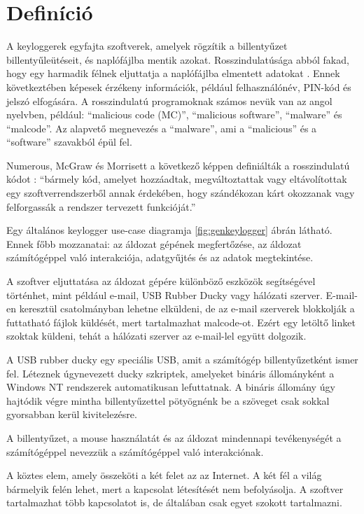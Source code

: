 \documentclass[12pt,a4paper,oneside]{report}
\begin{document}
\section{Definíció}
A keyloggerek egyfajta szoftverek, amelyek rögzítik a billentyűzet billentyűleütéseit, és naplófájlba mentik azokat. Rosszindulatúsága abból fakad, hogy egy harmadik félnek eljuttatja a naplófájlba elmentett adatokat \parencite{ahmed2014survey}. Ennek következtében képesek érzékeny információk, például felhasználónév, PIN-kód és jelszó elfogására.  A rosszindulatú programoknak számos nevük van az angol nyelvben, például: ``malicious code (MC)'', ``malicious software'', ``malware'' és ``malcode''. Az alapvető megnevezés a ``malware'', ami a ``malicious'' és a ``software'' szavakból épül fel. 

Numerous, McGraw és Morrisett a következő képpen definiálták a rosszindulatú kódot \cite{ahmed2014survey}: ``bármely kód, amelyet hozzáadtak, megváltoztattak vagy eltávolítottak egy szoftverrendszerből annak érdekében, hogy szándékozan kárt okozzanak vagy felforgassák a rendszer tervezett funkcióját.''

Egy általános keylogger use-case diagramja \ref{fig:genkeylogger} ábrán látható. Ennek főbb mozzanatai: az áldozat gépének megfertőzése, az áldozat számítógéppel való interakciója, adatgyűjtés és az adatok megtekintése.

A szoftver eljuttatása az áldozat gépére különböző eszközök segítségével történhet, mint például e-mail, USB Rubber Ducky vagy hálózati szerver. E-mail-en keresztül csatolmányban lehetne elküldeni, de az e-mail szerverek blokkolják a futtatható fájlok küldését, mert tartalmazhat malcode-ot. Ezért egy letöltő linket szoktak küldeni, tehát a hálózati szerver az e-mail-lel együtt dolgozik.

A USB rubber ducky egy speciális USB, amit a számítógép billentyűzetként ismer fel. Léteznek úgynevezett ducky szkriptek, amelyeket bináris állományként a Windows NT rendszerek automatikusan lefuttatnak. A bináris állomány úgy hajtódik végre mintha billentyűzettel pötyögnénk be a szöveget csak sokkal gyorsabban kerül kivitelezésre.

A billentyűzet, a mouse használatát és az áldozat mindennapi tevékenységét a számítógéppel nevezzük a számítógéppel való interakciónak.

A köztes elem, amely összeköti a két felet az az Internet. A két fél a világ bármelyik felén lehet, mert a kapcsolat létesítését nem befolyásolja. A szoftver tartalmazhat több kapcsolatot is, de általában csak egyet szokott tartalmazni.
\end{document}
